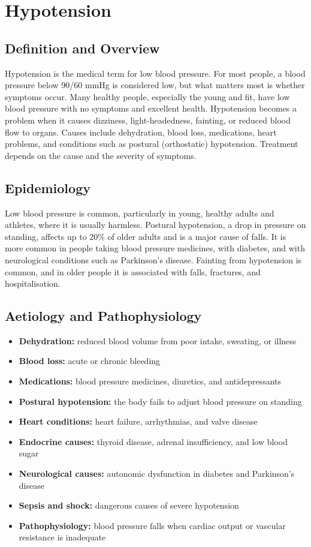 \chapter{Hypotension}

\section*{Definition and Overview}
Hypotension is the medical term for low blood pressure. For most people, a blood pressure below 90/60 mmHg is considered low, but what matters most is whether symptoms occur. Many healthy people, especially the young and fit, have low blood pressure with no symptoms and excellent health. Hypotension becomes a problem when it causes dizziness, light-headedness, fainting, or reduced blood flow to organs. Causes include dehydration, blood loss, medications, heart problems, and conditions such as postural (orthostatic) hypotension. Treatment depends on the cause and the severity of symptoms.

\section*{Epidemiology}
Low blood pressure is common, particularly in young, healthy adults and athletes, where it is usually harmless. Postural hypotension, a drop in pressure on standing, affects up to 20\% of older adults and is a major cause of falls. It is more common in people taking blood pressure medicines, with diabetes, and with neurological conditions such as Parkinson's disease. Fainting from hypotension is common, and in older people it is associated with falls, fractures, and hospitalisation.

\section*{Aetiology and Pathophysiology}
\begin{itemize}
    \item \textbf{Dehydration:} reduced blood volume from poor intake, sweating, or illness
    \item \textbf{Blood loss:} acute or chronic bleeding
    \item \textbf{Medications:} blood pressure medicines, diuretics, and antidepressants
    \item \textbf{Postural hypotension:} the body fails to adjust blood pressure on standing
    \item \textbf{Heart conditions:} heart failure, arrhythmias, and valve disease
    \item \textbf{Endocrine causes:} thyroid disease, adrenal insufficiency, and low blood sugar
    \item \textbf{Neurological causes:} autonomic dysfunction in diabetes and Parkinson's disease
    \item \textbf{Sepsis and shock:} dangerous causes of severe hypotension
    \item \textbf{Pathophysiology:} blood pressure falls when cardiac output or vascular resistance is inadequate
\end{itemize}

